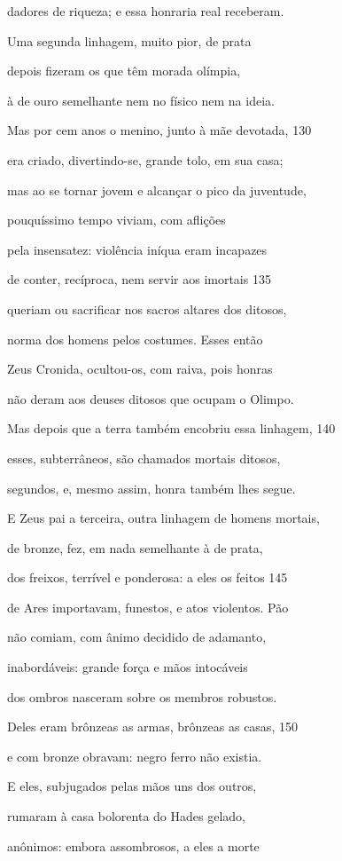 dadores de riqueza; e essa honraria real receberam.

Uma segunda linhagem, muito pior, de prata

depois fizeram os que têm morada olímpia,

à de ouro semelhante nem no físico nem na ideia.

Mas por cem anos o menino, junto à mãe devotada, \num{130}

era criado, divertindo-se, grande tolo, em sua casa;

mas ao se tornar jovem e alcançar o pico da juventude,

pouquíssimo tempo viviam, com aflições

pela insensatez: violência iníqua eram incapazes

de conter, recíproca, nem servir aos imortais \num{135}

queriam ou sacrificar nos sacros altares dos ditosos,

norma dos homens pelos costumes. Esses então

Zeus Cronida, ocultou-os, com raiva, pois honras

não deram aos deuses ditosos que ocupam o Olimpo.

Mas depois que a terra também encobriu essa linhagem, \num{140}

esses, subterrâneos, são chamados mortais ditosos,

segundos, e, mesmo assim, honra também lhes segue.

E Zeus pai a terceira, outra linhagem de homens mortais,

de bronze, fez, em nada semelhante à de prata,

dos freixos, terrível e ponderosa: a eles os feitos \num{145}

de Ares importavam, funestos, e atos violentos. Pão

não comiam, com ânimo decidido de adamanto,

inabordáveis: grande força e mãos intocáveis

dos ombros nasceram sobre os membros robustos.

Deles eram brônzeas as armas, brônzeas as casas, \num{150}

e com bronze obravam: negro ferro não existia.

E eles, subjugados pelas mãos uns dos outros,

rumaram à casa bolorenta do Hades gelado,

anônimos: embora assombrosos, a eles a morte

